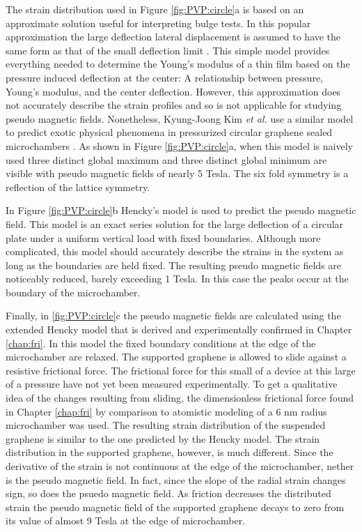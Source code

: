 The strain distribution used in Figure \ref{fig:PVP:circle}a is based on an approximate solution useful for interpreting bulge tests.
In this popular approximation the large deflection lateral displacement is assumed to have the same form as that of the small deflection limit \cite{Timoshenko}.
This simple model provides everything needed to determine the Young's modulus of a thin film based on the pressure induced deflection at the center: A relationship between pressure, Young's modulus, and the center deflection.
However, this approximation does not accurately describe the strain profiles and so is not applicable for studying pseudo magnetic fields.
Nonetheless, Kyung-Joong Kim \textit{et al.} use a similar model to predict exotic physical phenomena in pressurized circular graphene sealed microchambers \cite{Kim2011b}.
As shown in Figure \ref{fig:PVP:circle}a, when this model is naively used three distinct global maximum and three distinct global minimum are visible with pseudo magnetic fields of nearly 5 Tesla.
The six fold symmetry is a reflection of the lattice symmetry.

In Figure \ref{fig:PVP:circle}b Hencky's model is used to predict the pseudo magnetic field.
This model is an exact series solution for the large deflection of a circular plate under a uniform vertical load with fixed boundaries.
Although more complicated, this model should accurately describe the strains in the system as long as the boundaries are held fixed.
The resulting pseudo magnetic fields are noticeably reduced, barely exceeding 1 Tesla.
In this case the peaks occur at the boundary of the microchamber.

Finally, in \ref{fig:PVP:circle}c the pseudo magnetic fields are calculated using the extended Hencky model that is derived and experimentally confirmed in Chapter \ref{chap:fri}.
In this model the fixed boundary conditions at the edge of the microchamber are relaxed.
The supported graphene is allowed to slide against a resistive frictional force.
The frictional force for this small of a device at this large of a pressure have not yet been measured experimentally.
To get a qualitative idea of the changes resulting from sliding, the dimensionless frictional force found in Chapter \ref{chap:fri} by comparison to atomistic modeling of a 6 nm radius microchamber was used.
The resulting strain distribution of the suspended graphene is similar to the one predicted by the Hencky model.
The strain distribution in the supported graphene, however, is much different.
Since the derivative of the strain is not continuous at the edge of the microchamber, nether is the pseudo magnetic field.
In fact, since the slope of the radial strain changes sign, so does the psuedo magnetic field.
As friction decreases the distributed strain the pseudo magnetic field of the supported graphene decays to zero from its value of almost 9 Tesla at the edge of microchamber.

